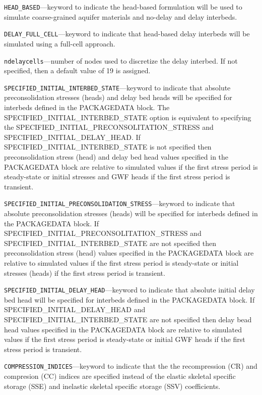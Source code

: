 \begin{description}
\item \texttt{HEAD\_BASED}---keyword to indicate the head-based formulation will be used to simulate coarse-grained aquifer materials and no-delay and delay interbeds.

\item \texttt{DELAY\_FULL\_CELL}---keyword to indicate that head-based delay interbeds will be simulated using a full-cell approach.

\item \texttt{ndelaycells}---number of nodes used to discretize the delay interbed. If not specified, then a default value of 19 is assigned.

\item \texttt{SPECIFIED\_INITIAL\_INTERBED\_STATE}---keyword to indicate that absolute preconsolidation stresses (heads) and delay bed heads will be specified for interbeds defined in the PACKAGEDATA block. The SPECIFIED\_INITIAL\_INTERBED\_STATE option is equivalent to specifying the SPECIFIED\_INITIAL\_PRECONSOLITATION\_STRESS and SPECIFIED\_INITIAL\_DELAY\_HEAD. If SPECIFIED\_INITIAL\_INTERBED\_STATE is not specified then preconsolidation stress (head) and delay bed head values specified in the PACKAGEDATA block are relative to simulated values if the first stress period is steady-state or initial stresses and GWF heads if the first stress period is transient.

\item \texttt{SPECIFIED\_INITIAL\_PRECONSOLIDATION\_STRESS}---keyword to indicate that absolute preconsolidation stresses (heads) will be specified for interbeds defined in the PACKAGEDATA block. If SPECIFIED\_INITIAL\_PRECONSOLITATION\_STRESS and SPECIFIED\_INITIAL\_INTERBED\_STATE are not specified then preconsolidation stress (head) values specified in the PACKAGEDATA block are relative to simulated values if the first stress period is steady-state or initial stresses (heads) if the first stress period is transient.

\item \texttt{SPECIFIED\_INITIAL\_DELAY\_HEAD}---keyword to indicate that absolute initial delay bed head will be specified for interbeds defined in the PACKAGEDATA block. If SPECIFIED\_INITIAL\_DELAY\_HEAD and SPECIFIED\_INITIAL\_INTERBED\_STATE are not specified then delay bead head values specified in the PACKAGEDATA block are relative to simulated values if the first stress period is steady-state or initial GWF heads if the first stress period is transient.

\item \texttt{COMPRESSION\_INDICES}---keyword to indicate that the the recompression (CR) and compresion (CC) indices are specified instead of the elastic skeletal specific storage (SSE) and inelastic skeletal specific storage (SSV) coefficients.


\end{description}
